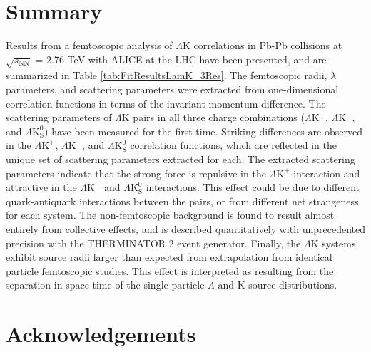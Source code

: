 \documentclass[ALICE,manyauthors]{cernphprep}
\newcommand{\ResultsDirBaseLamKch}{/home/jesse/Analysis/FemtoAnalysis/Results/Results_cLamcKch_20190319/}
\newcommand{\MomRes}{_MomResCrctn}%
\newcommand{\NonFlatBgdLamKch}{_NonFlatBgdCrctnLamK0LamKchPolynomial}
\newcommand{\ResNum}{_3Res}
\newcommand{\PrimMaxDecay}{_PrimMaxDecay10fm}
\newcommand{\ResMethod}{_UsingXiDataAndCoulombOnly}
\newcommand{\ParamFixAndShareLamKch}{_ShareLam_Dualie_ShareLam_ShareRadii}
\newcommand{\SaveNameModLamKch}{\MomRes\NonFlatBgdLamKch\ResNum\PrimMaxDecay\ResMethod\ParamFixAndShareLamKch}
\newcommand{\Lam}{$\Lambda$\xspace}
\newcommand{\LamK}{$\Lambda$K\xspace}
\newcommand{\LamKchP}{$\Lambda\mathrm{K^{+}}$\xspace}
\newcommand{\LamKchM}{$\Lambda\mathrm{K^{-}}$\xspace}
\newcommand{\LamKs}{$\Lambda\mathrm{K^{0}_{S}}$\xspace}
\begin{document}
\section{Summary}
\label{sec:Summary}



Results from a femtoscopic analysis of \LamK correlations in Pb-Pb collisions at $\sqrt{s_{\mathrm{NN}}}$ = 2.76 TeV with ALICE at the LHC have been presented, and are summarized in Table \ref{tab:FitResultsLamK_3Res}.
The femtoscopic radii, $\lambda$ parameters, and scattering parameters were extracted from one-dimensional correlation functions in terms of the invariant momentum difference.
The scattering parameters of \LamK pairs in all three charge combinations (\LamKchP, \LamKchM, and \LamKs) have been measured for the first time.
Striking differences are observed in the \LamKchP, \LamKchM, and \LamKs correlation functions, which are reflected in the unique set of scattering parameters extracted for each.
The extracted scattering parameters indicate that the strong force is repulsive in the \LamKchP interaction and attractive in the \LamKchM and \LamKs interactions.
This effect could be due to different quark-antiquark interactions between the pairs, or from different net strangeness for each system. 
The non-femtoscopic background is found to result almost entirely from collective effects, and is described quantitatively with unprecedented precision with the THERMINATOR 2 event generator.
Finally, the \LamK systems exhibit source radii larger than expected from extrapolation from identical particle femtoscopic studies.
This effect is interpreted as resulting from the separation in space-time of the single-particle \Lam and K source distributions.

\newenvironment{acknowledgement}{\relax}{\relax}
\begin{acknowledgement}
\section*{Acknowledgements}
\end{acknowledgement}
\end{document}
